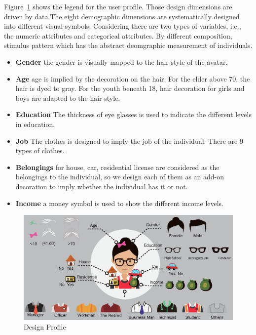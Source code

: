 Figure~\ref{fig:design_profile} shows the legend for the user profile. Those design dimensions are driven by data.The eight demographic dimensions are systematically designed into different visual symbols. Considering there are two types of variables, i.e., the numeric attributes and categorical attributes. By different composition, stimulus pattern which has the abstract deomgraphic measurement of individuals.

\begin{itemize}
\item \textbf{Gender} the gender is visually mapped to the hair style of the avatar. 
\item \textbf{Age} age is implied by the decoration on the hair. For the elder above 70, the hair is dyed to gray. For the youth beneath 18, hair decoration for girls and boys are adapted to the hair style.
\item \textbf{Education} The thickness of eye glasses is used to indicate the different levels in education.
\item \textbf{Job} The clothes is designed to imply the job of the individual. There are 9 types of clothes.
\item \textbf{Belongings} for house, car, residential license are considered as the belongings to the individual, so we design each of them as an add-on decoration to imply whether the individual has it or not.
\item \textbf{Income} a money symbol is used to show the different income levels.
\end{itemize} 

\begin{figure}[htb!]
 \centering %
 \includegraphics[width=\columnwidth]{pictures/design_profile}
 \caption{Design Profile}
 \label{fig:design_profile}
\end{figure}

